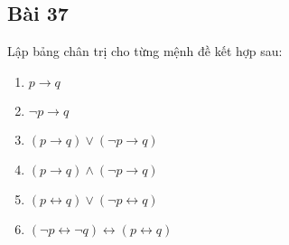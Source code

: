 \subsection*{Bài 37}
Lập bảng chân trị cho từng mệnh đề kết hợp sau:
\begin{multicols}{2}
    \begin{enumerate}[label=\alph*)]
        \item $p\rightarrow q$
        \item $\neg p\rightarrow q$
        \item $(p\rightarrow q)\lor (\neg p\rightarrow q)$
        \item $(p\rightarrow q)\land (\neg p\rightarrow q)$
        \item $(p\leftrightarrow q)\lor (\neg p\leftrightarrow q)$
        \item $(\neg p\leftrightarrow\neg q)\leftrightarrow(p\leftrightarrow q)$
    \end{enumerate}
\end{multicols}
